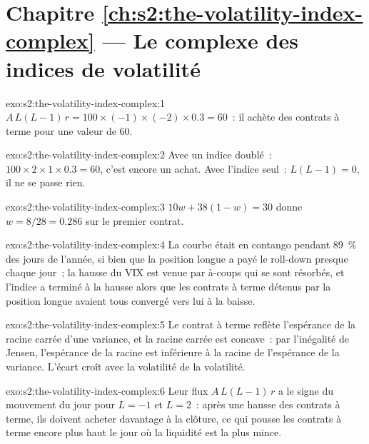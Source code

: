 \section*{Chapitre \ref{ch:s2:the-volatility-index-complex} --- Le complexe des indices de volatilité}

\begin{solution}{exo:s2:the-volatility-index-complex:1}
$A\,L(L - 1)\,r = 100 \times (-1) \times (-2) \times 0.3 = 60$~: il achète des contrats à terme pour une valeur de 60.
\end{solution}

\begin{solution}{exo:s2:the-volatility-index-complex:2}
Avec un indice doublé~: $100 \times 2 \times 1 \times 0.3 = 60$, c'est encore un achat. Avec l'indice seul~: $L(L - 1) = 0$, il ne se passe rien.
\end{solution}

\begin{solution}{exo:s2:the-volatility-index-complex:3}
$10w + 38(1 - w) = 30$ donne $w = 8/28 = 0.286$ sur le premier contrat.
\end{solution}

\begin{solution}{exo:s2:the-volatility-index-complex:4}
La courbe était en contango pendant 89~\% des jours de l'année, si bien que la position longue a payé le roll-down presque chaque jour~; la hausse du VIX est venue par à-coups qui
se sont résorbés, et l'indice a terminé à la hausse alors que les contrats à terme détenus par la position longue avaient tous convergé vers lui à la baisse.
\end{solution}

\begin{solution}{exo:s2:the-volatility-index-complex:5}
Le contrat à terme reflète l'espérance de la racine carrée d'une variance, et la racine carrée est concave~: par l'inégalité de Jensen, l'espérance de la racine est inférieure à la racine
de l'espérance de la variance. L'écart croît avec la volatilité de la volatilité.
\end{solution}

\begin{solution}{exo:s2:the-volatility-index-complex:6}
Leur flux $A\,L(L - 1)\,r$ a le signe du mouvement du jour pour $L = -1$ et $L = 2$~: après une hausse des contrats à terme, ils doivent acheter davantage à la clôture,
ce qui pousse les contrats à terme encore plus haut le jour où la liquidité est la plus mince.
\end{solution}

